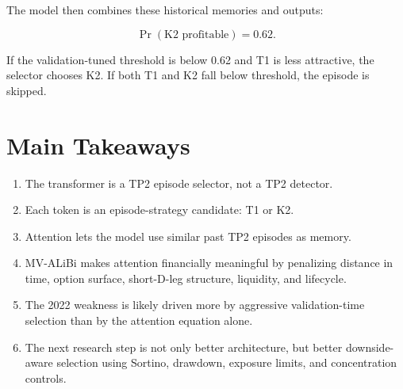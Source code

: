 \documentclass[11pt]{article}
\newcommand{\1}{\mathbf{1}}
\begin{document}
The model then combines these historical memories and outputs:

\[
  \Pr(\text{K2 profitable}) = 0.62.
\]

If the validation-tuned threshold is below 0.62 and T1 is less attractive, the
selector chooses K2. If both T1 and K2 fall below threshold, the episode is
skipped.

\section{Main Takeaways}

\begin{enumerate}[leftmargin=*]
  \item The transformer is a TP2 episode selector, not a TP2 detector.
  \item Each token is an episode-strategy candidate: T1 or K2.
  \item Attention lets the model use similar past TP2 episodes as memory.
  \item MV-ALiBi makes attention financially meaningful by penalizing distance
        in time, option surface, short-D-leg structure, liquidity, and lifecycle.
  \item The 2022 weakness is likely driven more by aggressive validation-time
        selection than by the attention equation alone.
  \item The next research step is not only better architecture, but better
        downside-aware selection using Sortino, drawdown, exposure limits, and
        concentration controls.
\end{enumerate}
\end{document}
